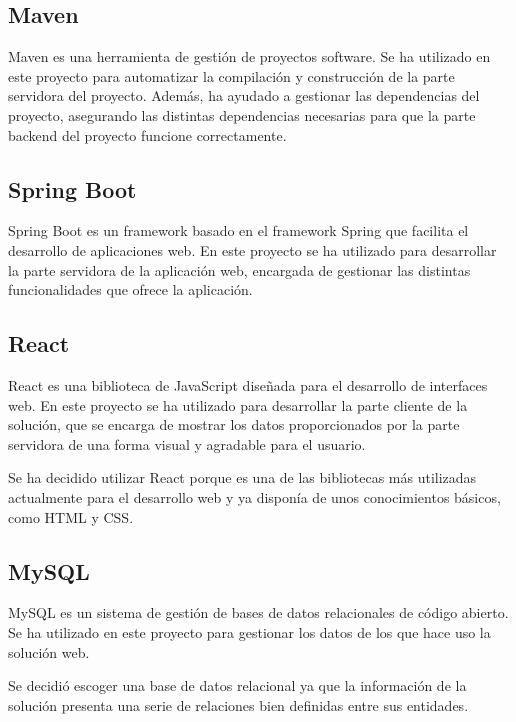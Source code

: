 \subsection{Maven}

Maven es una herramienta de gestión de proyectos software. Se ha utilizado en este proyecto para automatizar la compilación y construcción de la parte servidora del proyecto. Además, ha ayudado a gestionar las dependencias del proyecto, asegurando las distintas dependencias necesarias para que la parte backend del proyecto funcione correctamente. \cite{apache-maven}

\subsection{Spring Boot}

Spring Boot es un framework basado en el framework Spring que facilita el desarrollo de aplicaciones web. En este proyecto se ha utilizado para desarrollar la parte servidora de la aplicación web, encargada de gestionar las distintas funcionalidades que ofrece la aplicación. \cite{springboot}

\subsection{React}

React es una biblioteca de JavaScript diseñada para el desarrollo de interfaces web. En este proyecto se ha utilizado para desarrollar la parte cliente de la solución, que se encarga de mostrar los datos proporcionados por la parte servidora de una forma visual y agradable para el usuario.

Se ha decidido utilizar React porque es una de las bibliotecas más utilizadas actualmente para el desarrollo web y ya disponía de unos conocimientos básicos, como HTML y CSS. \cite{react}

\subsection{MySQL}

MySQL es un sistema de gestión de bases de datos relacionales de código abierto. Se ha utilizado en este proyecto para gestionar los datos de los que hace uso la solución web.

Se decidió escoger una base de datos relacional ya que la información de la solución presenta una serie de relaciones bien definidas entre sus entidades. \cite{mysql}

